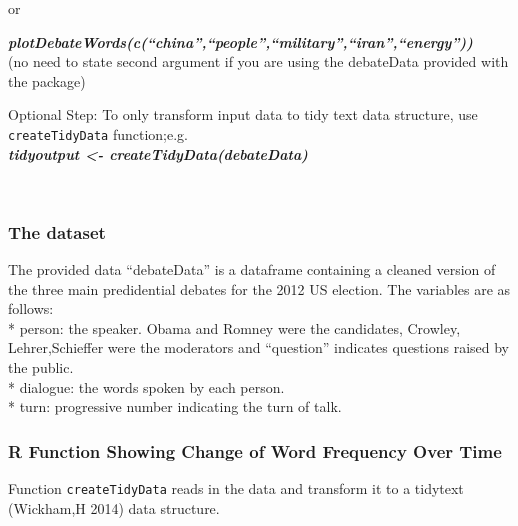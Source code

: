 \documentclass[
]{article}
\begin{document}
or

\textbf{\emph{plotDebateWords(c(``china'',``people'',``military'',``iran'',``energy''))}}\\
(no need to state second argument if you are using the debateData
provided with the package)

Optional Step: To only transform input data to tidy text data structure,
use \texttt{createTidyData} function;e.g.~\\
\textbf{\emph{tidyoutput \textless- createTidyData(debateData)}}

~

\hypertarget{the-dataset}{%
\subsubsection{The dataset}\label{the-dataset}}

The provided data ``debateData'' is a dataframe containing a cleaned
version of the three main predidential debates for the 2012 US election.
The variables are as follows:\\
* person: the speaker. Obama and Romney were the candidates, Crowley,
Lehrer,Schieffer were the moderators and ``question'' indicates
questions raised by the public.\\
* dialogue: the words spoken by each person.\\
* turn: progressive number indicating the turn of talk.\\

\hypertarget{r-function-showing-change-of-word-frequency-over-time}{%
\subsubsection{R Function Showing Change of Word Frequency Over
Time}\label{r-function-showing-change-of-word-frequency-over-time}}

Function \texttt{createTidyData} reads in the data and transform it to a
tidytext (Wickham,H 2014) data structure.
\end{document}
